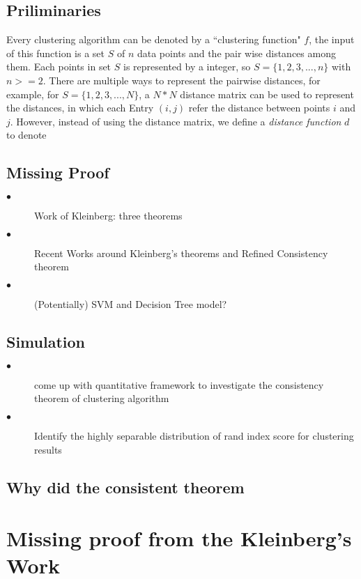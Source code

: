 \documentclass{uonmathreport}
\begin{document}
\subsection{Priliminaries} \label{subsec:priliminaries}
Every clustering algorithm can be denoted by a ``clustering function" $f$, the input of this function is a set $S$ of $n$ data points and the pair wise distances among them. Each points in set $S$ is represented by a integer, so $S = \{1,2,3,...,n\}$ with $n>=2 $. There are multiple ways to represent the pairwise distances, for example, for $S = \{1,2,3,...,N\}$, a $N*N$ distance matrix can be used to represent the distances, in which each Entry $(i,j)$ refer the distance between points $i$ and $j$. However, instead of using the distance matrix, we define a \textit{distance function} $d$ to denote


\subsection{Missing Proof} \label{subsec:Related Work}
\begin{description}
  \item[$\bullet$] Work of Kleinberg: three theorems
  \item[$\bullet$] Recent Works around Kleinberg's theorems and Refined Consistency theorem
  \item[$\bullet$] (Potentially) SVM and Decision Tree model?
\end{description}
\subsection{Simulation} \label{subsec:Our contribution}
\begin{description}
  \item[$\bullet$] come up with quantitative framework to investigate the consistency theorem of clustering algorithm
  
  \item[$\bullet$] Identify the highly separable distribution of rand index score for clustering results
\end{description}
\subsection{Why did the consistent theorem} \label{subsec:Our contribution}
\section{Missing proof from the Kleinberg's Work} \label{sec:Missing proof}
\end{document}
